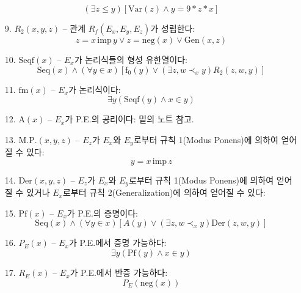 \documentclass[12pt]{paper}
\begin{document}
\begin{enumerate}
$$ \left( \exists z \le y \right) \left[ \mathrm{Var} \left( z \right) \land y = 9 * z * x \right] $$
\item[{9.}] $R_2 \left( x , y , z \right)$ -- 관계 $R_f \left( E_x , E_y , E_z \right)$가 성립한다:
$$ z = x \, \mathrm{imp} \, y \lor z = \mathrm{neg} \left( x \right) \lor \mathrm{Gen} \left( x , z \right) $$
\item[{10.}] $\mathrm{Seqf} \left( x \right)$ -- $E_x$가 논리식들의 형성 유한열이다:
$$ \mathrm{Seq} \left( x \right) \land \left( \forall y \in x \right) \left[ \mathrm{f}_0 \left( y \right) \lor \left( \exists z , w \prec_x y \right) R_2 \left( z , w , y \right) \right]$$
\item[{11.}] $\mathrm{fm} \left( x \right)$ -- $E_x$가 논리식이다:
$$ \exists y \left( \mathrm{Seqf} \left( y \right) \land x \in y \right) $$
\item[{12.}] $\mathrm{A} \left( x \right)$ -- $E_x$가 P.E.의 공리이다: 밑의 노트 참고.
\item[{13.}] $\mathrm{M.P.} \left( x , y , z \right)$ -- $E_z$가 $E_x$와 $E_y$로부터 규칙 1(Modus Ponens)에 의하여 얻어질 수 있다:
$$ y = x \, \mathrm{imp} \, z $$
\item[{14.}] $\mathrm{Der} \left( x , y , z \right)$ -- $E_z$가 $E_x$와 $E_y$로부터 규칙 1(Modus Ponens)에 의하여 얻어질 수 있거나 $E_x$로부터 규칙 2(Generalization)에 의하여 얻어질 수 있다:
\item[{15.}] $\mathrm{Pf} \left( x \right)$ -- $E_x$가 P.E.의 증명이다:
$$ \mathrm{Seq} \left( x \right) \land \left( \forall y \in x \right) \left[ A \left( y \right) \lor \left( \exists z , w \prec_x y \right) \mathrm{Der} \left( z , w , y \right) \right] $$
\item[{16.}] $P_E \left( x \right)$ -- $E_x$가 P.E.에서 증명 가능하다:
$$ \exists y \left( \mathrm{Pf} \left( y \right) \land x \in y \right) $$
\item[{17.}] $R_E \left( x \right)$ -- $E_x$가 P.E.에서 반증 가능하다:
$$ P_E \left( \mathrm {neg} \left( x \right) \right) $$
\end{enumerate}
\end{document}
